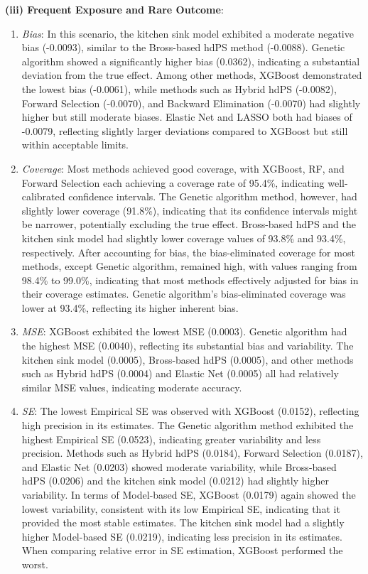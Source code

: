 \documentclass[sn-vancouver,Numbered,lineno,pdflatex]{sn-jnl}
\begin{document}
\textbf{(iii) Frequent Exposure and Rare Outcome}:

\begin{enumerate}
\def\labelenumi{\arabic{enumi}.}
\item
  \emph{Bias}: In this scenario, the kitchen sink model exhibited a
  moderate negative bias (-0.0093), similar to the Bross-based hdPS
  method (-0.0088). Genetic algorithm showed a significantly higher bias
  (0.0362), indicating a substantial deviation from the true effect.
  Among other methods, XGBoost demonstrated the lowest bias (-0.0061),
  while methods such as Hybrid hdPS (-0.0082), Forward Selection
  (-0.0070), and Backward Elimination (-0.0070) had slightly higher but
  still moderate biases. Elastic Net and LASSO both had biases of
  -0.0079, reflecting slightly larger deviations compared to XGBoost but
  still within acceptable limits.
\item
  \emph{Coverage}: Most methods achieved good coverage, with XGBoost,
  RF, and Forward Selection each achieving a coverage rate of 95.4\%,
  indicating well-calibrated confidence intervals. The Genetic algorithm
  method, however, had slightly lower coverage (91.8\%), indicating that
  its confidence intervals might be narrower, potentially excluding the
  true effect. Bross-based hdPS and the kitchen sink model had slightly
  lower coverage values of 93.8\% and 93.4\%, respectively. After
  accounting for bias, the bias-eliminated coverage for most methods,
  except Genetic algorithm, remained high, with values ranging from
  98.4\% to 99.0\%, indicating that most methods effectively adjusted
  for bias in their coverage estimates. Genetic algorithm's
  bias-eliminated coverage was lower at 93.4\%, reflecting its higher
  inherent bias.
\item
  \emph{MSE}: XGBoost exhibited the lowest MSE (0.0003). Genetic
  algorithm had the highest MSE (0.0040), reflecting its substantial
  bias and variability. The kitchen sink model (0.0005), Bross-based
  hdPS (0.0005), and other methods such as Hybrid hdPS (0.0004) and
  Elastic Net (0.0005) all had relatively similar MSE values, indicating
  moderate accuracy.
\item
  \emph{SE}: The lowest Empirical SE was observed with XGBoost (0.0152),
  reflecting high precision in its estimates. The Genetic algorithm
  method exhibited the highest Empirical SE (0.0523), indicating greater
  variability and less precision. Methods such as Hybrid hdPS (0.0184),
  Forward Selection (0.0187), and Elastic Net (0.0203) showed moderate
  variability, while Bross-based hdPS (0.0206) and the kitchen sink
  model (0.0212) had slightly higher variability. In terms of
  Model-based SE, XGBoost (0.0179) again showed the lowest variability,
  consistent with its low Empirical SE, indicating that it provided the
  most stable estimates. The kitchen sink model had a slightly higher
  Model-based SE (0.0219), indicating less precision in its estimates.
  When comparing relative error in SE estimation, XGBoost performed the
  worst.
\end{enumerate}
\end{document}
